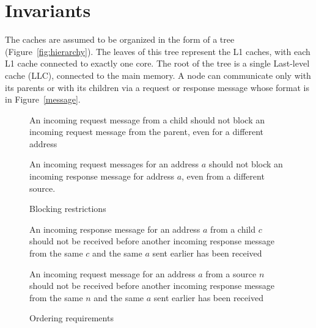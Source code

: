 \section{Invariants}
\label{sec:invariants}


The caches are assumed to be organized in the form of a tree
(Figure~\ref{fig:hierarchy}). The leaves of this tree represent the L1 caches,
with each L1 cache connected to exactly one core. The root of the tree is a
single Last-level cache (LLC), connected to the main memory. A node can
communicate only with its parents or with its children via a request or
response message whose format is in Figure~\ref{message}.

\begin{figure}
\begin{inv}
An incoming request message from a child should not block an incoming request
message from the parent, even for a different address\label{cReqNoBlockPReq}
\end{inv}
\begin{inv}
An incoming request messages for an address $a$ should not block an incoming
response message for address $a$, even from a different
source.\label{reqNoBlockReq}
\end{inv}
\caption{Blocking restrictions}
\label{blocking}
\end{figure}

\begin{figure}
\begin{inv}
An incoming response message for an address $a$ from a child $c$ should not be
received before another incoming response message from the same $c$ and the
same $a$ sent earlier has been received\label{cRespFifo}
\end{inv}
\begin{inv}
An incoming request message for an address $a$ from a source $n$ should not be
received before another incoming response message from the same $n$ and the
same $a$ sent earlier has been received\label{reqNoOvertakeResp}
\end{inv}
\caption{Ordering requirements}
\label{order}
\end{figure}

